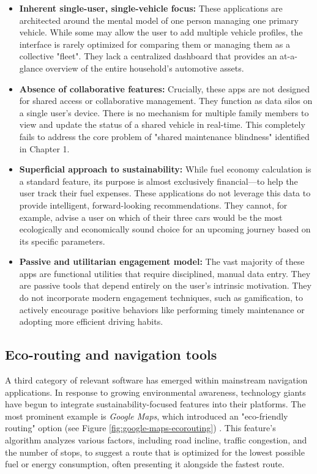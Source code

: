\begin{itemize}
    \item \textbf{Inherent single-user, single-vehicle focus:} These applications are architected around the mental model of one person managing one primary vehicle. While some may allow the user to add multiple vehicle profiles, the interface is rarely optimized for comparing them or managing them as a collective "fleet". They lack a centralized dashboard that provides an at-a-glance overview of the entire household's automotive assets.
    
    \textgap
    
    \item \textbf{Absence of collaborative features:} Crucially, these apps are not designed for shared access or collaborative management. They function as data silos on a single user's device. There is no mechanism for multiple family members to view and update the status of a shared vehicle in real-time. This completely fails to address the core problem of "shared maintenance blindness" identified in Chapter 1.
    
    \textgap
    
    \item \textbf{Superficial approach to sustainability:} While fuel economy calculation is a standard feature, its purpose is almost exclusively financial—to help the user track their fuel expenses. These applications do not leverage this data to provide intelligent, forward-looking recommendations. They cannot, for example, advise a user on which of their three cars would be the most ecologically and economically sound choice for an upcoming journey based on its specific parameters.
    
    \textgap
    
    \item \textbf{Passive and utilitarian engagement model:} The vast majority of these apps are functional utilities that require disciplined, manual data entry. They are passive tools that depend entirely on the user's intrinsic motivation. They do not incorporate modern engagement techniques, such as gamification, to actively encourage positive behaviors like performing timely maintenance or adopting more efficient driving habits.
\end{itemize}

\subsection{Eco-routing and navigation tools}
A third category of relevant software has emerged within mainstream navigation applications. In response to growing environmental awareness, technology giants have begun to integrate sustainability-focused features into their platforms. The most prominent example is \textit{Google Maps}, which introduced an "eco-friendly routing" option (see Figure \ref{fig:google-maps-ecorouting}) . This feature's algorithm analyzes various factors, including road incline, traffic congestion, and the number of stops, to suggest a route that is optimized for the lowest possible fuel or energy consumption, often presenting it alongside the fastest route.

